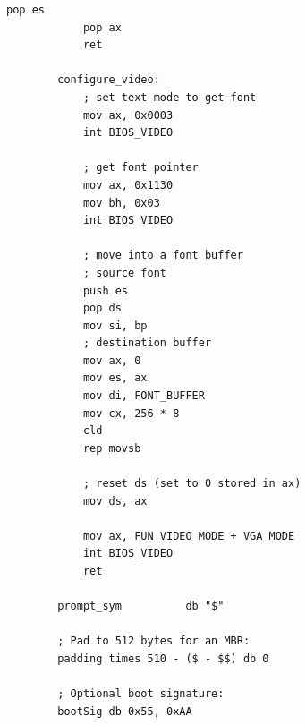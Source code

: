\documentclass{article}
\begin{document}
\begin{lstlisting}[caption={os623V06.asm listing}, captionpos=t]
            pop es
            pop ax
            ret

        configure_video:
            ; set text mode to get font
            mov ax, 0x0003
            int BIOS_VIDEO

            ; get font pointer
            mov ax, 0x1130
            mov bh, 0x03
            int BIOS_VIDEO

            ; move into a font buffer
            ; source font
            push es
            pop ds
            mov si, bp
            ; destination buffer
            mov ax, 0
            mov es, ax
            mov di, FONT_BUFFER
            mov cx, 256 * 8
            cld
            rep movsb

            ; reset ds (set to 0 stored in ax)
            mov ds, ax

            mov ax, FUN_VIDEO_MODE + VGA_MODE
            int BIOS_VIDEO
            ret

        prompt_sym          db "$"

        ; Pad to 512 bytes for an MBR:
        padding times 510 - ($ - $$) db 0

        ; Optional boot signature:
        bootSig db 0x55, 0xAA
    \end{lstlisting}
\end{document}
